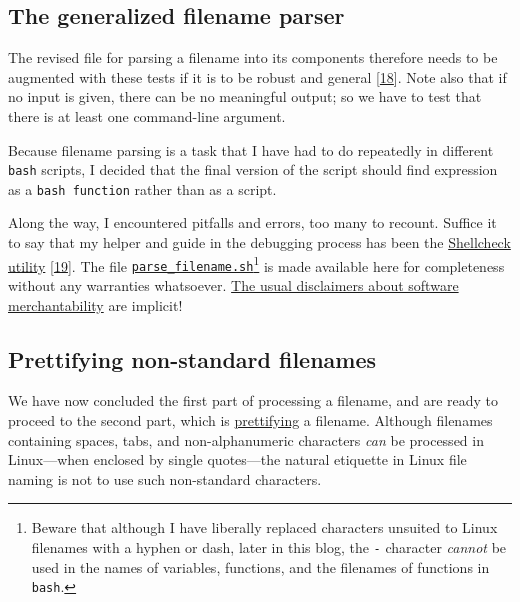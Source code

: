 \documentclass[
  a4paper,
]{article}
\begin{document}
\hypertarget{the-generalized-filename-parser}{%
\subsection{The generalized filename
parser}\label{the-generalized-filename-parser}}

The revised file for parsing a filename into its components therefore
needs to be augmented with these tests if it is to be robust and general
{[}\protect\hyperlink{ref-caveats}{18}{]}. Note also that if no input is
given, there can be no meaningful output; so we have to test that there
is at least one command-line argument.

Because filename parsing is a task that I have had to do repeatedly in
different \texttt{bash} scripts, I decided that the final version of the
script should find expression as a \texttt{bash\ function} rather than
as a script.

Along the way, I encountered pitfalls and errors, too many to recount.
Suffice it to say that my helper and guide in the debugging process has
been the \href{https://www.shellcheck.net/}{Shellcheck utility}
{[}\protect\hyperlink{ref-shellcheck}{19}{]}. The file
\href{scripts/parse_filename.sh}{\texttt{parse\_filename.sh}}\footnote{Beware
  that although I have liberally replaced characters unsuited to Linux
  filenames with a hyphen or dash, later in this blog, the \texttt{-}
  character \emph{cannot} be used in the names of variables, functions,
  and the filenames of functions in \texttt{bash}.} is made available
here for completeness without any warranties whatsoever.
\href{https://core.ac.uk/download/pdf/267973227.pdf}{The usual
disclaimers about software merchantability} are implicit!
 \normalfont

\hypertarget{prettifying-non-standard-filenames}{%
\subsection{Prettifying non-standard
filenames}\label{prettifying-non-standard-filenames}}

We have now concluded the first part of processing a filename, and are
ready to proceed to the second part, which is
\href{https://www.thefreedictionary.com/prettifying}{prettifying} a
filename. Although filenames containing spaces, tabs, and
non-alphanumeric characters \emph{can} be processed in Linux---when
enclosed by single quotes---the natural etiquette in Linux file naming
is not to use such non-standard characters.
\end{document}
